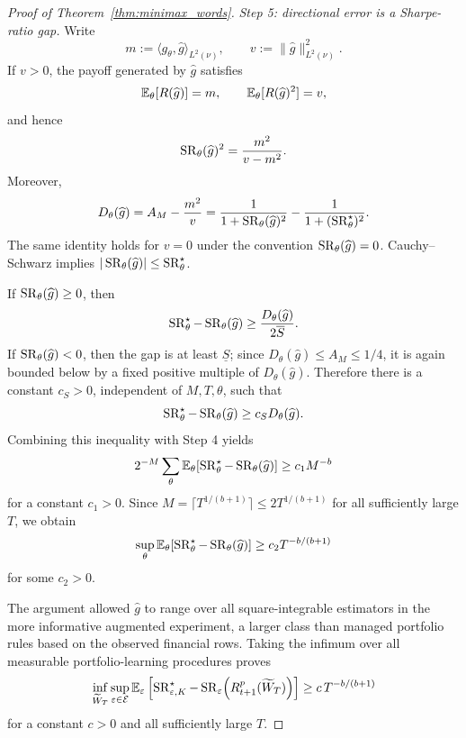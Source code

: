 \begin{proof}[Proof of Theorem~\ref{thm:minimax_words}]
\medskip
\noindent\textit{Step 5: directional error is a Sharpe-ratio gap.}
Write
\[
m:=\langle g_\theta,\widehat g\rangle_{L^2(\nu)},
\qquad
v:=\|\widehat g\|_{L^2(\nu)}^2.
\]
If $v>0$, the payoff generated by $\widehat g$ satisfies
\[
\mathbb{E}_\theta[R(\widehat g)]=m,
\qquad
\mathbb{E}_\theta[R(\widehat g)^2]=v,
\]
and hence
\[
\operatorname{SR}_\theta(\widehat g)^2
=
\frac{m^2}{v-m^2}.
\]
Moreover,
\[
D_\theta(\widehat g)
=
A_M-\frac{m^2}{v}
=
\frac{1}{1+\operatorname{SR}_\theta(\widehat g)^2}
-
\frac{1}{1+(\operatorname{SR}_\theta^\star)^2}.
\]
The same identity holds for $v=0$ under the convention
$\operatorname{SR}_\theta(\widehat g)=0$. Cauchy--Schwarz implies
$|\operatorname{SR}_\theta(\widehat g)|\leq\operatorname{SR}_\theta^\star$.

If $\operatorname{SR}_\theta(\widehat g)\geq0$, then
\[
\operatorname{SR}_\theta^\star-\operatorname{SR}_\theta(\widehat g)
\geq
\frac{D_\theta(\widehat g)}{2\overline S}.
\]
If $\operatorname{SR}_\theta(\widehat g)<0$, then the gap is at least $\underline S$;
since $D_\theta(\widehat g)\leq A_M\leq1/4$, it is again bounded below by
a fixed positive multiple of $D_\theta(\widehat g)$. Therefore there is a
constant $c_S>0$, independent of $M,T,\theta$, such that
\[
\operatorname{SR}_\theta^\star-\operatorname{SR}_\theta(\widehat g)
\geq
c_S D_\theta(\widehat g).
\]
Combining this inequality with Step 4 yields
\[
2^{-M}\sum_\theta
\mathbb{E}_\theta\!\left[
\operatorname{SR}_\theta^\star-\operatorname{SR}_\theta(\widehat g)
\right]
\geq
c_1M^{-b}
\]
for a constant $c_1>0$. Since
$M=\lceil T^{1/(b+1)}\rceil\leq2T^{1/(b+1)}$ for all sufficiently large
$T$, we obtain
\[
\sup_\theta
\mathbb{E}_\theta\!\left[
\operatorname{SR}_\theta^\star-\operatorname{SR}_\theta(\widehat g)
\right]
\geq
c_2T^{-b/(b+1)}
\]
for some $c_2>0$.

The argument allowed $\widehat g$ to range over all square-integrable
estimators in the more informative augmented experiment, a larger class than
managed portfolio rules based on the observed financial rows. Taking the
infimum over all measurable portfolio-learning procedures proves
\[
\inf_{\widetilde W_T}
\sup_{\varepsilon\in\mathcal E}
\mathbb E_\varepsilon
\left[
\operatorname{SR}^\star_{\varepsilon,K}
-
\operatorname{SR}_\varepsilon\!\left(R^p_{t+1}(\widetilde W_T)\right)
\right]
\geq
c\,T^{-b/(b+1)}
\]
for a constant $c>0$ and all sufficiently large $T$.
\end{proof}
